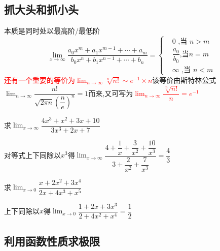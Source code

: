 \documentclass[8pt a4paper, oneside, UTF8]{ctexbook}
\begin{document}
\begin{sloppypar}
    \subsection{抓大头和抓小头}
    本质是同时处以最高阶/最低阶
    $$
        \lim_{x\to\infty}\dfrac{a_0x^m+a_1x^{m-1}+\cdots+a_m}{b_0x^n+b_1x^{n-1}+\cdots+b_n}=\left.\left\{\begin{aligned}&0\text{ ,当 }n>m\\&\dfrac{a_0}{b_0}\text{,当}n=m\\&\infty\text{ ,当 }n<m\end{aligned}\right.\right.
    $$
    \textcolor{red}{还有一个重要的等价为$\lim_{n\to \infty}\sqrt[n]{n!}\sim e^{-1}\times n$}该等价由斯特林公式$\lim_{n\to\infty}\dfrac{n!}{\sqrt{2\pi n}\left(\dfrac ne\right)^n}=1$而来,又可写为\textcolor{red}{$\lim_{n\rightarrow\infty}\dfrac{\sqrt[n]{n!}}{n}=e^{-1}$}\label{stlgs1}
    \begin{problem}
    求$\lim_{x\to \infty}\dfrac{4x^3+x^2+3x+10}{3x^3+2x+7}$
    \end{problem}
    \begin{solution}
        对等式上下同除以$x^3$得$\lim_{x \to \infty}\dfrac{4+\dfrac1x+\dfrac3{x^2}+\dfrac{10}{x^3}}{3+\dfrac2{x^2}+\dfrac7{x^3}}=\dfrac{4}{3}$
    \end{solution}
    \begin{problem}
    求$\lim_{x\to 0}\dfrac{x+2x^{2}+3x^{4}}{2x+4x^{3}+x^{5}}$
    \end{problem}
    \begin{solution}
        上下同除以$x$得$\lim_{x\to 0}\dfrac{1+2x+3x^{3}}{2+4x^{2}+x^{4}}=\dfrac{1}{2}$
    \end{solution}
    \subsection{利用函数性质求极限}

\end{sloppypar}
\end{document}
